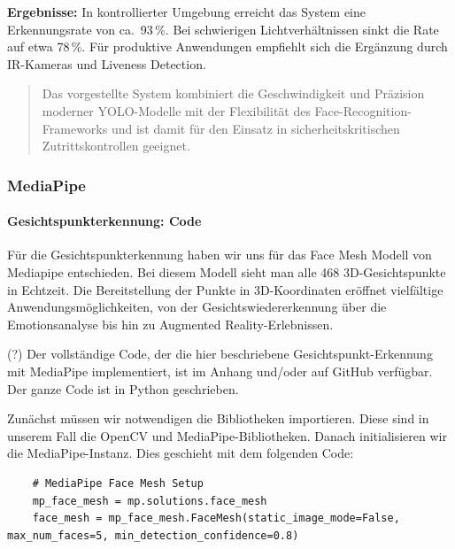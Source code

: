 \textbf{Ergebnisse:} In kontrollierter Umgebung erreicht das System eine Erkennungsrate von ca.~93\,\%. Bei schwierigen Lichtverhältnissen sinkt die Rate auf etwa 78\,\%. Für produktive Anwendungen empfiehlt sich die Ergänzung durch IR-Kameras und Liveness Detection.

\begin{quote}
Das vorgestellte System kombiniert die Geschwindigkeit und Präzision moderner YOLO-Modelle mit der Flexibilität des Face-Recognition-Frameworks und ist damit für den Einsatz in sicherheitskritischen Zutrittskontrollen geeignet.
\end{quote}

\subsubsection{MediaPipe}
\paragraph{Gesichtspunkterkennung: Code}
Für die Gesichtspunkterkennung haben wir uns für das Face Mesh Modell von Mediapipe entschieden. Bei diesem Modell sieht man alle 468 3D-Gesichtspunkte in Echtzeit. Die Bereitstellung der Punkte in 3D-Koordinaten eröffnet vielfältige Anwendungsmöglichkeiten, von der Gesichtswiedererkennung über die Emotionsanalyse bis hin zu Augmented Reality-Erlebnissen.

(?) Der vollständige Code, der die hier beschriebene Gesichtspunkt-Erkennung mit MediaPipe implementiert, ist im Anhang und/oder auf GitHub verfügbar.
Der ganze Code ist in Python geschrieben. 

Zunächst müssen wir notwendigen die Bibliotheken importieren. Diese sind in unserem Fall die OpenCV und MediaPipe-Bibliotheken.
Danach initialisieren wir die MediaPipe-Instanz. Dies geschieht mit dem folgenden Code:
\begin{lstlisting}
    # MediaPipe Face Mesh Setup
    mp_face_mesh = mp.solutions.face_mesh
    face_mesh = mp_face_mesh.FaceMesh(static_image_mode=False, max_num_faces=5, min_detection_confidence=0.8)
\end{lstlisting}

